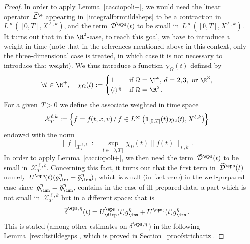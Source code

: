 \begin{proof}
In order to apply Lemma~\ref{cacciopoli+}, we would need the linear operator~$ \widetilde {\mathcal{L}}^{\e}$ appearing in~\eqref{integralformtildeheps} to be a contraction in~$L^\infty([0,T],X^{\ell,k})$, and the term~$\mathcal{\widetilde D}^{\eps}(t) $ to be small in~$L^\infty([0,T],X^{\ell,k})$. It turns out that in the $\R^2$-case, to reach this goal, we have to introduce a weight in time (note that in the references mentioned above in this context, only the three-dimensional case is treated, in which case it is not necessary to introduce that weight). We thus introduce a function $\chi_\Omega(t)$ defined by
\[
\forall t \in \R^+, \quad \chi_\Omega(t) :=
\begin{cases}
1 & \text{if } \Omega = \T^d, \, d = 2,3, \text{ or } \R^3, \\
\langle t \rangle^\frac14 &\text{if } \Omega = \R^2 \,.
\end{cases}
\]
For a given~$T>0 $ we define the associate weighted in time space
\[
\mathcal{X}_T^{\ell,k} := \Bigl\{f = f(t,x,v) \, / \, f\in L^\infty\left(\mathbf{1}_{[0,T]}(t)\chi_\Omega(t),X^{\ell,k}\right)
\Bigr\}
\]
endowed with the norm
\[
\|f\|_{\mathcal{X}_T^{\ell,k} }:= \sup_{t\in [0,T]}\chi_\Omega(t)\|f(t)\|_{\ell,k}\,.
\]
In order to apply Lemma~\ref{cacciopoli+}, we then need the term~$\mathcal{\widetilde D}^{\eps}(t) $ to be small in~$\mathcal{X}^{\ell,k}_T$. Concerning this fact, it turns out that the first term in~$ \mathcal{\widetilde D}^{\eps}(t) $ namely~$U^\eps (t) (g^\eta_{\inn} - \bar g^\eta_{\inn}) $, which is small (in fact zero) in the well-prepared case since~$g^\eta_{\inn} = \bar g^\eta_{\inn} $, contains in the case of ill-prepared data, a part which is not small in~${\mathcal X}_T^{{\ell},k}$ but in a different space: that is
\[
\overline\delta^{\eps,\eta}(t)=U^\eps_{\disp}(t) g^\eta_{\inn} + U^{\eps \sharp}(t)g^\eta_{\inn}\,.
\]
This is stated (among other estimates on $\bar \delta^{\eps,\eta}$) in the following Lemma~\ref{resultstildegeps}, which is proved in Section~\ref{proofstrichartz}.



\end{proof}
